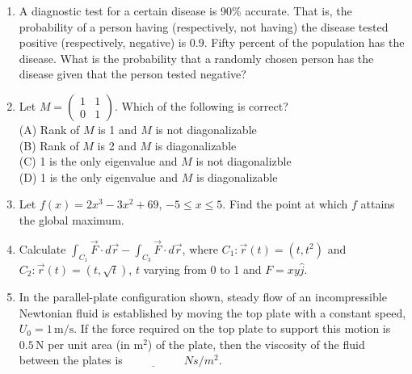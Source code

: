 \documentclass[journal,12pt,onecolumn]{IEEEtran}
\theoremstyle{remark}
\begin{document}
\begin{enumerate}
    \item A diagnostic test for a certain disease is 90\% accurate. That is, the probability of a person having (respectively, not having) the disease tested positive (respectively, negative) is 0.9. Fifty percent of the population has the disease. What is the probability that a randomly chosen person has the disease given that the person tested negative?

    \item Let $M = \begin{pmatrix} 1 & 1 \\ 0 & 1 \end{pmatrix}$. Which of the following is correct? \\
    (A) Rank of $M$ is 1 and $M$ is not diagonalizable \\
    (B) Rank of $M$ is 2 and $M$ is diagonalizable \\
    (C) 1 is the only eigenvalue and $M$ is not diagonalizble \\
    (D) 1 is the only eigenvalue and $M$ is diagonalizable

    \item Let $f(x) = 2x^3 - 3x^2 + 69$, $-5 \leq x \leq 5$. Find the point at which $f$ attains the global maximum.

    \item Calculate $\int_{C_1} \vec{F} \cdot d\vec{r} - \int_{C_3} \vec{F} \cdot d\vec{r}$, where $C_1 : \vec{r}(t) = (t, t^2)$ and $C_2 : \vec{r}(t) = (t, \sqrt{t})$, $t$ varying from 0 to 1 and $F = xy \hat{j}$.
\item In the parallel-plate configuration shown, steady flow of an incompressible Newtonian fluid is established by moving the top plate with a constant speed, $U_0 = 1 \, \text{m/s}$. If the force required on the top plate to support this motion is $0.5 \, \text{N}$ per unit area (in $\text{m}^2$) of the plate, then the viscosity of the fluid between the plates is $\underline{\hspace{2cm}}$ $ Ns/m^2$.


\end{enumerate}
\end{document}

